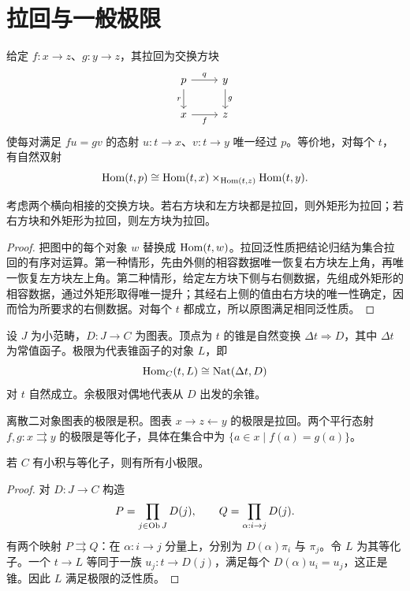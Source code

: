 \section{拉回与一般极限}
\begin{definition}[范畴中的拉回]
给定 $f:x\to z$、$g:y\to z$，其拉回为交换方块
\[
\begin{tikzcd}
p\ar[r,"q"]\ar[d,"r"']&y\ar[d,"g"]\\
x\ar[r,"f"']&z
\end{tikzcd}
\]
使每对满足 $fu=gv$ 的态射 $u:t\to x$、$v:t\to y$ 唯一经过 $p$。等价地，对每个 $t$，有自然双射
\[
\operatorname{Hom}(t,p)\cong\operatorname{Hom}(t,x)\times_{\operatorname{Hom}(t,z)}\operatorname{Hom}(t,y).
\]
\end{definition}
\begin{lemma}[拉回的粘贴]
考虑两个横向相接的交换方块。若右方块和左方块都是拉回，则外矩形为拉回；若右方块和外矩形为拉回，则左方块为拉回。
\end{lemma}
\begin{proof}
把图中的每个对象 $w$ 替换成 $\operatorname{Hom}(t,w)$。拉回泛性质把结论归结为集合拉回的有序对运算。第一种情形，先由外侧的相容数据唯一恢复右方块左上角，再唯一恢复左方块左上角。第二种情形，给定左方块下侧与右侧数据，先组成外矩形的相容数据，通过外矩形取得唯一提升；其经右上侧的值由右方块的唯一性确定，因而恰为所要求的右侧数据。对每个 $t$ 都成立，所以原图满足相同泛性质。
\end{proof}
\begin{definition}[锥与极限]
设 $J$ 为小范畴，$D:J\to C$ 为图表。顶点为 $t$ 的锥是自然变换 $\Delta t\Rightarrow D$，其中 $\Delta t$ 为常值函子。极限为代表锥函子的对象 $L$，即
\[
\operatorname{Hom}_C(t,L)\cong\operatorname{Nat}(\Delta t,D)
\]
对 $t$ 自然成立。余极限对偶地代表从 $D$ 出发的余锥。
\end{definition}
\begin{example}
离散二对象图表的极限是积。图表 $x\to z\leftarrow y$ 的极限是拉回。两个平行态射 $f,g:x\rightrightarrows y$ 的极限是等化子，具体在集合中为 $\{a\in x\mid f(a)=g(a)\}$。
\end{example}
\begin{proposition}[积与等化子构造极限]
若 $C$ 有小积与等化子，则有所有小极限。
\end{proposition}
\begin{proof}
对 $D:J\to C$ 构造
\[
P=\prod_{j\in\operatorname{Ob} J}D(j),
\qquad Q=\prod_{\alpha:i\to j}D(j).
\]
有两个映射 $P\rightrightarrows Q$：在 $\alpha:i\to j$ 分量上，分别为 $D(\alpha)\pi_i$ 与 $\pi_j$。令 $L$ 为其等化子。一个 $t\to L$ 等同于一族 $u_j:t\to D(j)$，满足每个 $D(\alpha)u_i=u_j$，这正是锥。因此 $L$ 满足极限的泛性质。
\end{proof}

